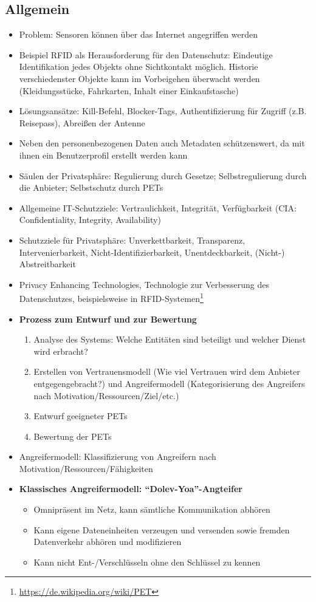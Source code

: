 \subsection{Allgemein}
\begin{itemize}
	\item Problem: Sensoren können über das Internet angegriffen werden
	\item Beispiel RFID als Herausforderung für den Datenschutz: Eindeutige Identifikation jedes Objekts ohne Sichtkontakt möglich. Historie verschiedenster Objekte kann im Vorbeigehen überwacht werden (Kleidungsstücke, Fahrkarten, Inhalt einer Einkaufstasche)
	\item Lösungsansätze: Kill-Befehl, Blocker-Tags, Authentifizierung für Zugriff (z.B. Reisepass), Abreißen der Antenne
	\item Neben den personenbezogenen Daten auch Metadaten schützenswert, da mit ihnen ein Benutzerprofil erstellt werden kann
	\item Säulen der Privatsphäre: Regulierung durch Gesetze; Selbstregulierung durch die Anbieter; Selbstschutz durch PETs
	\item Allgemeine IT-Schutzziele: Vertraulichkeit, Integrität, Verfügbarkeit (CIA: Confidentiality, Integrity, Availability)
	\item Schutzziele für Privatsphäre: Unverkettbarkeit, Transparenz, Intervenierbarkeit, Nicht-Identifizierbarkeit, Unentdeckbarkeit, (Nicht-) Abstreitbarkeit
	\item Privacy Enhancing Technologies, Technologie zur Verbesserung des Datenschutzes, beispielsweise in RFID-Systemen\footnote{\url{https://de.wikipedia.org/wiki/PET}}
	\item \textbf{Prozess zum Entwurf und zur Bewertung}
	\begin{enumerate}
		\item Analyse des Systems: Welche Entitäten sind beteiligt und welcher Dienst wird erbracht?
		\item Erstellen von Vertrauensmodell (Wie viel Vertrauen wird dem Anbieter entgegengebracht?) und Angreifermodell (Kategorisierung des Angreifers nach Motivation/Ressourcen/Ziel/etc.)
		\item Entwurf geeigneter PETs
		\item Bewertung der PETs
	\end{enumerate}
	\item Angreifermodell: Klassifizierung von Angreifern nach Motivation/Ressourcen/Fähigkeiten
	\item \textbf{Klassisches Angreifermodell: "`Dolev-Yoa"'-Angteifer}
	\begin{itemize}
		\item Omnipräsent im Netz, kann sämtliche Kommunikation abhören
		\item Kann eigene Dateneinheiten verzeugen und versenden sowie fremden Datenverkehr abhören und modifizieren
		\item Kann nicht Ent-/Verschlüsseln ohne den Schlüssel zu kennen
	\end{itemize}
\end{itemize}


